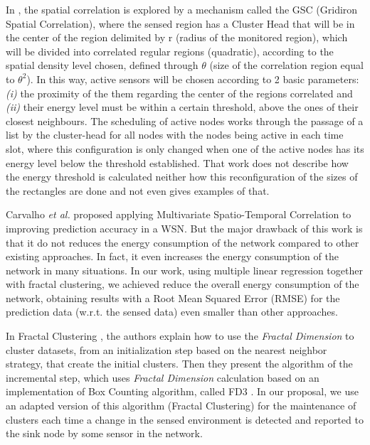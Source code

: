 \documentclass[conference]{IEEEtran}
\begin{document}
In \cite{Shah2007}, the spatial correlation is explored by a mechanism called
the GSC (Gridiron Spatial Correlation), where the sensed region has a Cluster
Head that will be in the center of the region delimited by r (radius of the
monitored region), which will be divided into correlated regular regions
(quadratic), according to the spatial density level chosen, defined through
$\theta$ (size of the correlation region equal to $\theta^2$). In this way,
active sensors will be chosen according to 2 basic parameters: {\it (i)} the
proximity of the them regarding the center of the regions correlated and {\it
(ii)} their energy level must be within a certain threshold, above the ones of
their closest neighbours. The scheduling of active nodes works through the
passage of a list by the cluster-head for all nodes with the nodes being active
in each time slot, where this configuration is only changed when one of the
active nodes has its energy level below the threshold established.
That work does not describe how the energy threshold is calculated neither how
this reconfiguration of the sizes of the rectangles are done and not even gives
examples of that.

Carvalho \textit{et al.} \cite{Carvalho2011} proposed applying Multivariate
Spatio-Temporal Correlation to improving prediction accuracy in a WSN. But the
major drawback of this work is that it do not reduces the energy consumption of
the network compared to other existing approaches. In fact, it even increases
the energy consumption of the network in many situations. In our work, using
multiple linear regression together with fractal clustering, we achieved reduce
the overall energy consumption of the network, obtaining results with a Root
Mean Squared Error (RMSE) for the prediction data (w.r.t. the sensed data) even
smaller than other approaches.

In Fractal Clustering \cite{Barbara2000}, the authors explain how to use the
\textit{Fractal Dimension} to cluster datasets, from an initialization step
based on the nearest neighbor strategy, that create the initial clusters. Then
they present the algorithm of the incremental step, which uses \textit{Fractal
Dimension} calculation based on an implementation of Box Counting algorithm,
called FD3 \cite{Liebovitch1989}. In our proposal, we use an adapted version of
this algorithm (Fractal Clustering) for the maintenance of clusters each time a
change in the sensed environment is detected and reported to the sink node by
some sensor in the network.
\end{document}
